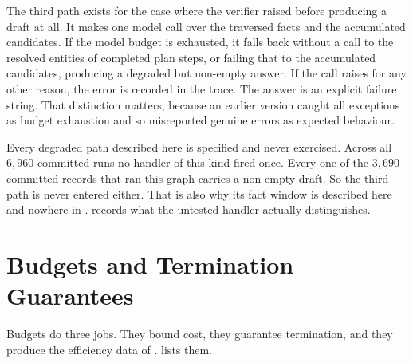 The third path exists for the case where the verifier raised before producing a
draft at all. It makes one model call over the traversed facts and the
accumulated candidates. If the model budget is exhausted, it falls back without
a call to the resolved entities of completed plan steps, or failing that to the
accumulated candidates, producing a degraded but non-empty answer. If the call
raises for any other reason, the error is recorded in the trace. The answer is
an explicit failure string. That distinction matters, because an earlier version
caught all exceptions as budget exhaustion and so misreported genuine errors as
expected behaviour.

Every degraded path described here is specified and never exercised. Across all
$6{,}960$ committed runs no handler of this kind fired once. Every one of the
$3{,}690$ committed records that ran this graph carries a non-empty draft. So
the third path is never entered either. That is also why its fact window is
described here and nowhere in . 
records what the untested handler actually distinguishes.

\section{Budgets and Termination Guarantees}\label{sec:budgets}

Budgets do three jobs. They bound cost, they guarantee
termination, and they produce the efficiency data of .
 lists them.

